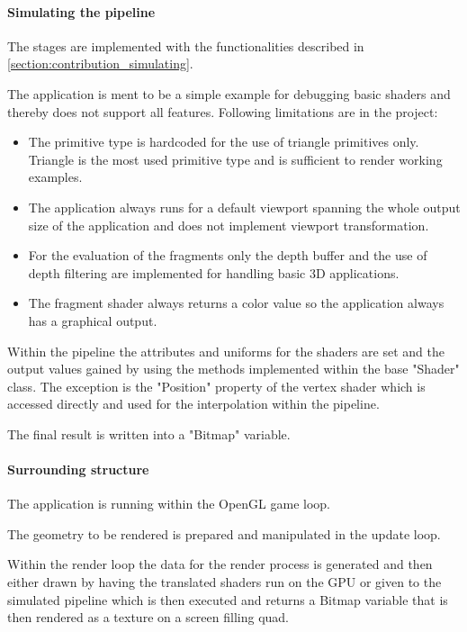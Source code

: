 \paragraph{Simulating the pipeline}

The stages are implemented with the functionalities described in \autoref{section:contribution_simulating}.

The application is ment to be a simple example for debugging basic shaders and thereby does not support all features. Following limitations are in the project:
\begin{itemize}
\item The primitive type is hardcoded for the use of triangle primitives only. Triangle is the most used primitive type and is sufficient to render working examples.
\item The application always runs for a default viewport spanning the whole output size of the application and does not implement viewport transformation.
\item For the evaluation of the fragments only the depth buffer and the use of depth filtering are implemented for handling basic 3D applications.
\item The fragment shader always returns a color value so the application always has a graphical output.
\end{itemize}

Within the pipeline the attributes and uniforms for the shaders are set and the output values gained by using the methods implemented within the base "Shader" class. The exception is the "Position" property of the vertex shader which is accessed directly and used for the interpolation within the pipeline.

The final result is written into a "Bitmap" variable.

\paragraph{Surrounding structure}

The application is running within the OpenGL game loop.

The geometry to be rendered is prepared and manipulated in the update loop.

Within the render loop the data for the render process is generated and then either drawn by having the translated shaders run on the GPU or given to the simulated pipeline which is then executed and returns a Bitmap variable that is then rendered as a texture on a screen filling quad.

